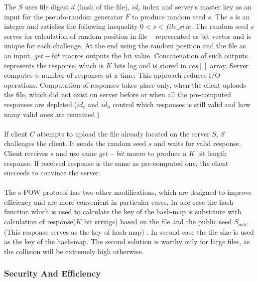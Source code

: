 \documentclass[12pt]{article}
\begin{document}
The $S$ uses file digest $d$ (hash of the file), $id_c$ index and server's master key as an input for the  pseudo-random generator $F$ to produce random seed $s$. The  $s$ is an integer and   satisfies the following inequality $0 < s < file\_size $. The random seed $s$ serves for calculation of random position in file -- represented as bit vector and is unique for each challenge. At the end  using the random  position and the file as an input, $get-bit$ macros outputs the bit value. Concatenation of such outputs represents the response, which is $K$ bits log and is stored in $res[]$ array. Server computes $n$ number of responses at a time. This approach reduces I/O operations. Computation of responses takes place only, when the client uploads the file, which did not exist on server before or when  all the pre-computed responses are depleted.($id_c$ and $id_u$ control which responses is still valid and how many valid ones are remained.)\\\\
If client $C$ attempts to upload the file already located on the server $S$, $S$ challenges the client. It sends the random seed $s$ and waits for valid response. Client receives $s$ and use same $get-bit$ macro to produce a $K$ bit length response. If received response is the same as pre-computed one, the client succeeds to convince the server.\\\\
The s-POW protocol has two other modifications, which are designed to improve efficiency and are more convenient in particular cases. In one case the hash function which is used to calculate the key of the hash-map is substitute with calculation of response($K$ bit strings) based on the file and the public seed $S_{pub}$. (This response serves as the key of hash-map) . In second case the file size is used as the key of the hash-map. The second solution is worthy only for large files, as the collision will be extremely high otherwise.

\subsubsection{Security And Efficiency}
\label{subsub:secAndeff2}
\end{document}
